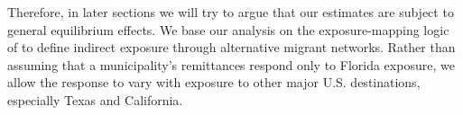 Therefore, in later sections we will try to argue that our estimates are subject to general equilibrium effects. We base our analysis on the exposure-mapping logic of \textcite{aronow2017} to define indirect exposure through alternative migrant networks. Rather than assuming that a municipality’s remittances respond only to Florida exposure, we allow the response to vary with exposure to other major U.S. destinations, especially Texas and California. 
